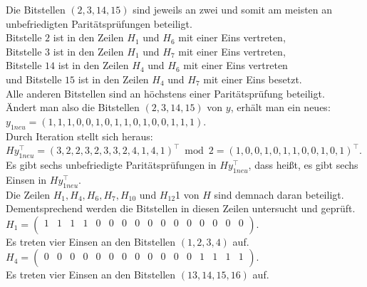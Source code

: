 \begin{Beispiel}
        
        
        Die Bitstellen $(2, 3, 14, 15)$ sind jeweils an zwei und somit am meisten an unbefriedigten Paritätsprüfungen beteiligt.\\ 
        Bitstelle $2$ ist in den Zeilen $H_1$ und $H_6$ mit einer Eins vertreten,\\ 
        Bitstelle $3$ ist in den Zeilen $H_1$ und $H_7$ mit einer Eins vertreten,\\
        Bitstelle $14$ ist in den Zeilen $H_4$ und $H_6$ mit einer Eins vertreten\\
        und Bitstelle $15$ ist in den Zeilen $H_4$ und $H_7$ mit einer Eins besetzt.\\
        Alle anderen Bitstellen sind an höchstens einer Paritätsprüfung beteiligt.\\
        
         
        Ändert man also die Bitstellen $(2, 3, 14, 15)$ von $y$, erhält man ein neues:\\
        $y_{1neu} = (1,1,1,0,0,1,0,1,1,0,1,0,0,1,1,1).$\\
        
        Durch Iteration stellt sich heraus:\\
        $Hy_{1neu}^\intercal = (3,2,2,3,2,3,3,2,4,1,4,1)^\intercal \bmod 2 =(1,0,0,1,0,1,1,0,0,1,0,1)^\intercal.$\\
        
        Es gibt sechs unbefriedigte Paritätsprüfungen in $Hy_{1neu}^\intercal$,
        dass hei\ss{}t, es gibt sechs Einsen in $Hy_{1neu}^\intercal.$\\
        Die Zeilen $H_1, H_4, H_6, H_7, H_{10}$ und $H_{12}$1 von $H$ sind demnach daran beteiligt.\\ 
        Dementsprechend werden die Bitstellen in diesen Zeilen untersucht und geprüft.\\
        
        $H_1= \left( \begin{array}{rrrrrrrrrrrrrrrr}
            1 & 1 & 1 & 1 & 0 & 0 & 0 & 0 & 0 & 0 & 0 & 0 & 0 & 0 & 0 & 0 \\
           \end{array}\right). 
        $\\
        Es treten vier Einsen an den Bitstellen $(1, 2, 3, 4)$ auf.\\
        
        $H_4= \left( \begin{array}{rrrrrrrrrrrrrrrr}
            0 & 0 & 0 & 0 & 0 & 0 & 0 & 0 & 0 & 0 & 0 & 0 & 1 & 1 & 1 & 1 \\
           \end{array}\right). 
        $\\
        Es treten vier Einsen an den Bitstellen $(13, 14, 15, 16)$ auf.\\
        

\end{Beispiel}
